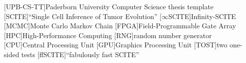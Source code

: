\theoremstyle{definition}
\newtheorem{definition}{Definition}[chapter]
\newtheorem{example}[definition]{Example}

\theoremstyle{plain}
\newtheorem{lemma}[definition]{Lemma}
\newtheorem{theorem}[definition]{Theorem}
\newtheorem{corollary}[definition]{Corollary}


\newcommand*{\eg}{e.\,g.}
\newcommand*{\ie}{i.\,e.}
\newcommand*{\cf}{c.\,f.}
\newcommand*{\etal}{et~al.}

[UPB-CS-TT]{Paderborn University Computer Science thesis template}
[SCITE]{``Single Cell Inference of Tumor Evolution''}
[$\infty$SCITE]{Infinity-SCITE}
[MCMC]{Monte Carlo Markov Chain}
[FPGA]{Field-Programmable Gate Array}
[HPC]{High-Performance Computing}
[RNG]{random number generator}
[CPU]{Central Processing Unit}
[GPU]{Graphics Processing Unit}
[TOST]{two one-sided tests}
[ffSCITE]{``fabulously fast SCITE''}

\DeclareMathOperator*{\argmax}{arg\,max}
\DeclareMathOperator*{\argmin}{arg\,min}


